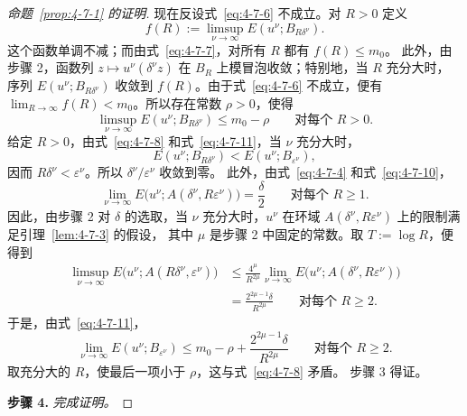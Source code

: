 \begin{proof}[命题~\ref{prop:4-7-1} 的证明]
现在反设式~\eqref{eq:4-7-6} 不成立。对 $R>0$ 定义
\[
  f(R):=\limsup_{\nu\to\infty}E(u^\nu;B_{R\delta^\nu}).
\]
这个函数单调不减；而由式~\eqref{eq:4-7-7}，对所有 $R$ 都有 $f(R)\le m_0$。
此外，由步骤 2，函数列
$z\mapsto u^\nu(\delta^\nu z)$ 在 $B_R$ 上模冒泡收敛；特别地，当 $R$ 充分大时，
序列 $E(u^\nu;B_{R\delta^\nu})$ 收敛到 $f(R)$。由于式~\eqref{eq:4-7-6}
不成立，便有 $\lim_{R\to\infty}f(R)<m_0$。所以存在常数 $\rho>0$，使得
\begin{equation}\label{eq:4-7-11}
  \limsup_{\nu\to\infty}E(u^\nu;B_{R\delta^\nu})
  \le m_0-\rho
  \qquad\text{对每个 }R>0.
\end{equation}
给定 $R>0$，由式~\eqref{eq:4-7-8} 和式~\eqref{eq:4-7-11}，当 $\nu$ 充分大时，
\[
  E(u^\nu;B_{R\delta^\nu})<E(u^\nu;B_{\varepsilon^\nu}),
\]
因而 $R\delta^\nu<\varepsilon^\nu$。所以 $\delta^\nu/\varepsilon^\nu$ 收敛到零。
此外，由式~\eqref{eq:4-7-4} 和式~\eqref{eq:4-7-10}，
\[
  \lim_{\nu\to\infty}
  E\bigl(u^\nu;A(\delta^\nu,R\varepsilon^\nu)\bigr)
  =\frac\delta2
  \qquad\text{对每个 }R\ge1.
\]
因此，由步骤 2 对 $\delta$ 的选取，当 $\nu$ 充分大时，$u^\nu$ 在环域
$A(\delta^\nu,R\varepsilon^\nu)$ 上的限制满足引理~\ref{lem:4-7-3} 的假设，
其中 $\mu$ 是步骤 2 中固定的常数。取 $T:=\log R$，便得到
\[
  \begin{aligned}
  \limsup_{\nu\to\infty}
  E\bigl(u^\nu;A(R\delta^\nu,\varepsilon^\nu)\bigr)
  &\le\frac{4^\mu}{R^{2\mu}}\lim_{\nu\to\infty}
  E\bigl(u^\nu;A(\delta^\nu,R\varepsilon^\nu)\bigr)\\
  &=\frac{2^{2\mu-1}\delta}{R^{2\mu}}
  \qquad\text{对每个 }R\ge2.
  \end{aligned}
\]
于是，由式~\eqref{eq:4-7-11}，
\[
  \lim_{\nu\to\infty}E(u^\nu;B_{\varepsilon^\nu})
  \le m_0-\rho+\frac{2^{2\mu-1}\delta}{R^{2\mu}}
  \qquad\text{对每个 }R\ge2.
\]
取充分大的 $R$，使最后一项小于 $\rho$，这与式~\eqref{eq:4-7-8} 矛盾。
步骤 3 得证。

\medskip
\noindent\textbf{步骤 4.}\quad
\emph{完成证明。}


\end{proof}
